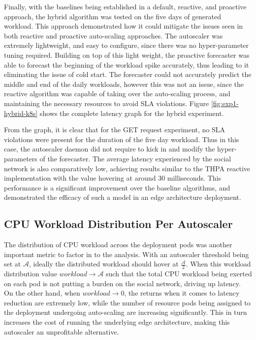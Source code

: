 Finally, with the baselines being established in a default, reactive, and proactive approach, the hybrid algorithm was tested on the five days of generated workload. This approach demonstrated how it could mitigate the issues seen in both reactive and proactive auto-scaling approaches. The autoscaler was extremely lightweight, and easy to configure, since there was no hyper-parameter tuning required. Building on top of this light weight, the proactive forecaster was able to forecast the beginning of the workload spike accurately, thus leading to it eliminating the issue of cold start. The forecaster could not accurately predict the middle and end of the daily workloads, however this was not an issue, since the reactive algorithm was capable of taking over the auto-scaling process, and maintaining the necessary resources to avoid SLA violations. Figure \ref{fig:exp1-hybrid-k8s} shows the complete latency graph for the hybrid experiment.\par

From the graph, it is clear that for the GET request experiment, no SLA violations were present for the duration of the five day workload. Thus in this case, the autoscaler daemon did not require to kick in and modify the hyper-parameters of the forecaster. The average latency experienced by the social network is also comparatively low, achieving results similar to the THPA reactive implementation with the value hovering at around 30 milliseconds. This performance is a significant improvement over the baseline algorithms, and demonstrated the efficacy of such a model in an edge architecture deployment.\par


\subsection {CPU Workload Distribution Per Autoscaler}
\label{subsec:ch5-exp1-workload-dist}

The distribution of CPU workload across the deployment pods was another important metric to factor in to the analysis. With an autoscaler threshold being set at $\mathcal{A}$, ideally the distributed workload should hover at $\frac{\mathcal{A}}{2}$. When this workload distribution value $workload \rightarrow \mathcal{A}$ such that the total CPU workload being exerted on each pod is not putting a burden on the social network, driving up latency. On the other hand, when $workload \rightarrow \mathcal{0}$, the returns when it comes to latency reduction are extremely low, while the number of resource pods being assigned to the deployment undergoing auto-scaling are increasing significantly. This in turn increases the cost of running the underlying edge architecture, making this autoscaler an unprofitable alternative.\par

